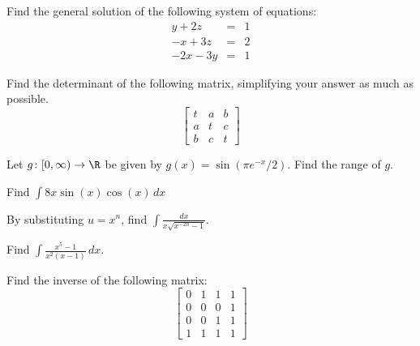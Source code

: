 \documentclass[12pt,twoside]{shefexam}
\newcommand{\xra}       {\rightarrow}
\renewcommand{\:}{\colon}
\begin{document}
 \question %
  Find the general solution of the following system of equations:
  \begin{eqnarray*}
   y+2z &=& 1 \\ -x+3z &=& 2 \\ -2x-3y &=& 1
  \end{eqnarray*} \vspace{-2ex}

 \question %
  Find the determinant of the following matrix, simplifying 
  your answer as much as possible.
  \[ \left[\begin{array}{ccc}
      t & a & b \\ a & t & c \\ b & c & t
     \end{array}\right]
  \]

\setcounter{enumi}{0}
\gdef\theenumi{\textbf{\sectionstyle{secnum}\arabic{enumi}}}%
\gdef\thequestion{\sectionstyle{secnum}\arabic{enumi}}%

 \question %
  Let $g\:[0,\infty)\xra{}\R$ be given by
  $g(x)=\sin(\pi e^{-x}/2)$.  Find the range of $g$.

 \question %
  Find $\int 8x\sin(x)\cos(x)\,dx$

 \question %
  By substituting $u=x^n$, find 
  $\displaystyle\int\frac{dx}{x\sqrt{x^{-2n}-1}}$.

 \question %
  Find $\displaystyle{\int\frac{x^5-1}{x^2(x-1)}\,dx}$.

 \question %
  Find the inverse of the following matrix:
  {\small \[ \left[ \begin{array}{cccc}
    0 & 1 & 1 & 1 \\
    0 & 0 & 0 & 1 \\
    0 & 0 & 1 & 1 \\
    1 & 1 & 1 & 1 
   \end{array}\right]
  \]}

\endpaper
\end{document}
